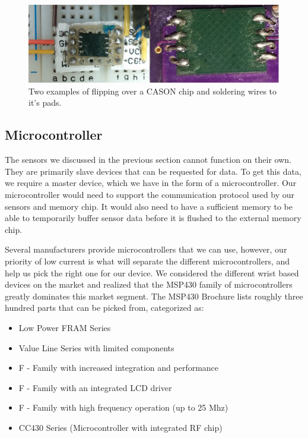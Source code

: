 \begin{figure}
\begin{center}
\includegraphics[width=1.0\textwidth]{images/CASON.jpg}
\caption{Two examples of flipping over a CASON chip and soldering wires to it's pads.}
\label{Fig:CASON}
\end{center}
\end{figure}
 

\subsection{Microcontroller}
\label{Sec:MicroController}

The sensors we discussed in the previous section cannot function on their own. They are primarily slave devices that can be requested for data. To get this data, we require a master device, which we have in the form of a microcontroller. Our microcontroller would need to support the communication protocol used by our sensors and memory chip. It would also need to have a sufficient memory to be able to temporarily buffer sensor data before it is flushed to the external memory chip. 

Several manufacturers provide microcontrollers that we can use, however, our priority of low current is what will separate the different microcontrollers, and help us pick the right one for our device. We considered the different wrist based devices on the market and realized that the MSP430 family of microcontrollers greatly dominates this market segment. The MSP430 Brochure \cite{instruments2009msp430} lists roughly three hundred parts that can be picked from, categorized as:

\begin{itemize}
  \item Low Power FRAM Series
  \item Value Line Series with limited components
  \item F - Family with increased integration and performance
  \item F - Family with an integrated LCD driver
  \item F - Family with high frequency operation (up to 25 Mhz)
  \item CC430 Series (Microcontroller with integrated RF chip)
\end{itemize}

